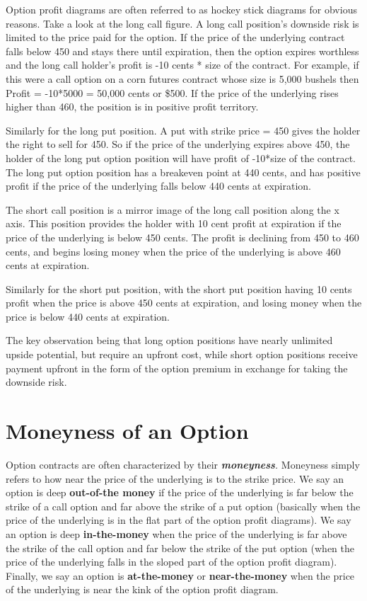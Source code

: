 \documentclass[
  letterpaper,
  DIV=11,
  numbers=noendperiod]{scrreprt}
\begin{document}
Option profit diagrams are often referred to as hockey stick diagrams
for obvious reasons. Take a look at the long call figure. A long call
position's downside risk is limited to the price paid for the option. If
the price of the underlying contract falls below 450 and stays there
until expiration, then the option expires worthless and the long call
holder's profit is -10 cents * size of the contract. For example, if
this were a call option on a corn futures contract whose size is 5,000
bushels then Profit = -10*5000 = 50,000 cents or \$500. If the price of
the underlying rises higher than 460, the position is in positive profit
territory.

Similarly for the long put position. A put with strike price = 450 gives
the holder the right to sell for 450. So if the price of the underlying
expires above 450, the holder of the long put option position will have
profit of -10*size of the contract. The long put option position has a
breakeven point at 440 cents, and has positive profit if the price of
the underlying falls below 440 cents at expiration.

The short call position is a mirror image of the long call position
along the x axis. This position provides the holder with 10 cent profit
at expiration if the price of the underlying is below 450 cents. The
profit is declining from 450 to 460 cents, and begins losing money when
the price of the underlying is above 460 cents at expiration.

Similarly for the short put position, with the short put position having
10 cents profit when the price is above 450 cents at expiration, and
losing money when the price is below 440 cents at expiration.

The key observation being that long option positions have nearly
unlimited upside potential, but require an upfront cost, while short
option positions receive payment upfront in the form of the option
premium in exchange for taking the downside risk.

\section{Moneyness of an Option}\label{moneyness-of-an-option}

Option contracts are often characterized by their
\emph{\textbf{moneyness}.} Moneyness simply refers to how near the price
of the underlying is to the strike price. We say an option is deep
\textbf{out-of-the money} if the price of the underlying is far below
the strike of a call option and far above the strike of a put option
(basically when the price of the underlying is in the flat part of the
option profit diagrams). We say an option is deep \textbf{in-the-money}
when the price of the underlying is far above the strike of the call
option and far below the strike of the put option (when the price of the
underlying falls in the sloped part of the option profit diagram).
Finally, we say an option is \textbf{at-the-money} or
\textbf{near-the-money} when the price of the underlying is near the
kink of the option profit diagram.
\end{document}
